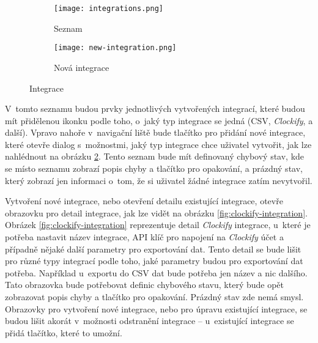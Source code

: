 \begin{figure}[h]
    \centering
    \begin{subfigure}[b]{0.4\textwidth}
		\centering
		\texttt{[image: integrations.png]}
		\caption{Seznam}
		\label{fig:integration-list}
	\end{subfigure}
	\hspace{2cm}
	\begin{subfigure}[b]{0.4\textwidth}
		\centering
		\texttt{[image: new-integration.png]}
		\caption{Nová integrace}
		\label{fig:new-integration}
	\end{subfigure}
	\caption{Integrace}
	\label{fig:integrations}
\end{figure}

V~tomto seznamu budou prvky jednotlivých vytvořených integrací, které budou mít přidělenou ikonku podle toho, o~jaký typ integrace se jedná (CSV, \emph{Clockify}, a další). Vpravo nahoře v~navigační liště bude tlačítko pro přidání nové integrace, které otevře dialog s~možnostmi, jaký typ integrace chce uživatel vytvořit, jak lze nahlédnout na obrázku \ref{fig:new-integration}. Tento seznam bude mít definovaný chybový stav, kde se místo seznamu zobrazí popis chyby a tlačítko pro opakování, a prázdný stav, který zobrazí jen informaci o~tom, že si uživatel žádné integrace zatím nevytvořil.

Vytvoření nové integrace, nebo otevření detailu existující integrace, otevře obrazovku pro detail integrace, jak lze vidět na obrázku \ref{fig:clockify-integration}. Obrázek \ref{fig:clockify-integration} reprezentuje detail \emph{Clockify} integrace, u~které je potřeba nastavit název integrace, API klíč pro napojení na \emph{Clockify} účet a případně nějaké další parametry pro exportování dat. Tento detail se bude lišit pro různé typy integrací podle toho, jaké parametry budou pro exportování dat potřeba. Například u~exportu do CSV dat bude potřeba jen název a nic dalšího. Tato obrazovka bude potřebovat definic chybového stavu, který bude opět zobrazovat popis chyby a tlačítko pro opakování. Prázdný stav zde nemá smysl. Obrazovky pro vytvoření nové integrace, nebo pro úpravu existující integrace, se budou lišit akorát v~možnosti odstranění integrace – u~existující integrace se přidá tlačítko, které to umožní.

